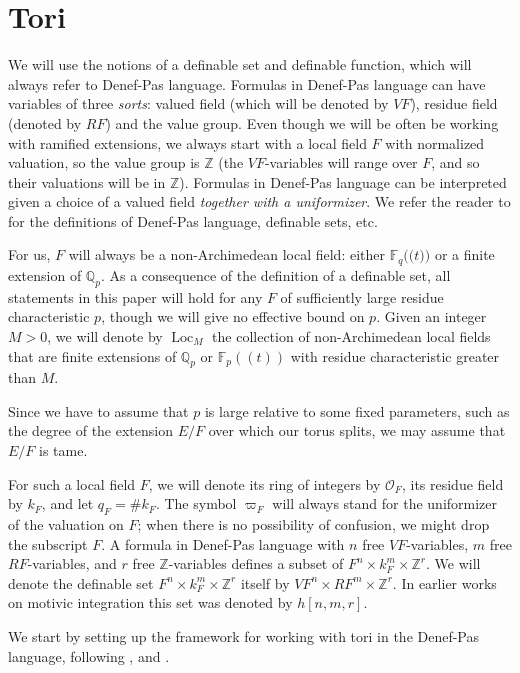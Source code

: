 \documentclass{amsart}
\newcommand{\Q}{{\mathbb Q}}
\newcommand{\F}{{\mathbb F}}
\newcommand{\Z}{{\mathbb Z}}
\newcommand{\ri}{\mathcal{O}}
\newcommand{\loc}{\operatorname{Loc}}
\def\llp{\mathopen{(\!(}}
\def\rrp{\mathopen{)\!)}}
\theoremstyle{plain}
\theoremstyle{definition}
\begin{document}
\section{Tori} 
We will use the notions of a definable set and definable function, which will always refer to Denef-Pas language. 
Formulas in Denef-Pas language can have variables of three \emph{sorts}: valued field (which will be denoted by $VF$), residue field (denoted by $RF$) and the value group. Even though we will be often be working with ramified extensions, we always start with a local field $F$ with normalized valuation, so the value group is $\Z$ (the $VF$-variables will range over $F$, and so their valuations will be in $\Z$).
Formulas in Denef-Pas language can be interpreted given a choice of a valued field \emph{together with a uniformizer}. 
We refer the reader to \cite{what's the best ref?} for the definitions of Denef-Pas language, definable sets, etc. 

For us, $F$ will always be a non-Archimedean local field: either $\F_q\llp t\rrp$ or a finite extension of $\Q_p$.
As a consequence of the definition of a definable set, all statements in this paper will hold for any $F$ of sufficiently large residue characteristic $p$, 
though we will give no effective bound on $p$. 
Given an integer $M>0$, we will denote by $\loc_M$ the collection of non-Archimedean local fields that are finite extensions of $\Q_p$ or $\F_p((t))$ with residue characteristic greater than $M$. 

Since we have to assume that $p$ is large relative to some fixed parameters, such as the degree of the extension $E/F$ over which our torus splits, we may assume that $E/F$ is tame.  

For such a local field $F$, we will denote its ring of integers by $\ri_F$, its residue field by $k_F$, and let $q_F=\# k_F$. The symbol $\varpi_F$ will always stand for the uniformizer of the valuation on $F$; when there is no possibility of confusion, we might drop the subscript $F$. 
A formula in Denef-Pas language  with $n$ free $VF$-variables, $m$ free $RF$-variables, and $r$ free 
$\Z$-variables 
defines a subset of $F^n\times k_F^m \times \Z^r$. 
We will denote the definable set $F^n\times k_F^m \times \Z^r$ itself by $VF^n\times RF^m\times \Z^r$. In earlier works on motivic integration this set was denoted by $h[n,m,r]$. 

We start by setting up the framework for working with tori in the Denef-Pas language, following \cite{cluckers-hales-loeser}, \cite{CGH-2} and \cite{hales:transfert}.
\end{document}
